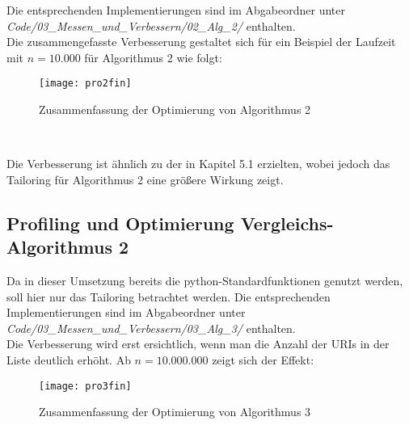 \documentclass[
10pt, %
a4paper, %
oneside, %
headinclude,footinclude, %
BCOR5mm, %
]{scrartcl}
\begin{document}
Die entsprechenden Implementierungen sind im Abgabeordner unter\\ \textit{Code/03\_Messen\_und\_Verbessern/02\_Alg\_2/} enthalten.\\

Die zusammengefasste Verbesserung gestaltet sich für ein Beispiel der Laufzeit mit \(n=10.000\) für Algorithmus 2 wie folgt:\\
\begin{figure}[h!]
	\centering 
	\texttt{[image: pro2fin]} 
	\caption[Zusammenfassung Optimierung Alg. 2]{Zusammenfassung der Optimierung von Algorithmus 2}
\end{figure}\

Die Verbesserung ist ähnlich zu der in Kapitel 5.1 erzielten, wobei jedoch das Tailoring für Algorithmus 2 eine größere Wirkung zeigt.

\subsection{Profiling und Optimierung Vergleichs-Algorithmus 2}
Da in dieser Umsetzung bereits die python-Standardfunktionen genutzt werden, soll hier nur das Tailoring betrachtet werden. Die entsprechenden Implementierungen sind im Abgabeordner unter \textit{Code/03\_Messen\_und\_Verbessern/03\_Alg\_3/} enthalten.\\

Die Verbesserung wird erst ersichtlich, wenn man die Anzahl der URIs in der Liste deutlich erhöht. Ab \(n=10.000.000\) zeigt sich der Effekt:\\
\begin{figure}[h!]
	\centering 
	\texttt{[image: pro3fin]} 
	\caption[Zusammenfassung Optimierung Alg. 3]{Zusammenfassung der Optimierung von Algorithmus 3}
\end{figure}\
\end{document}
